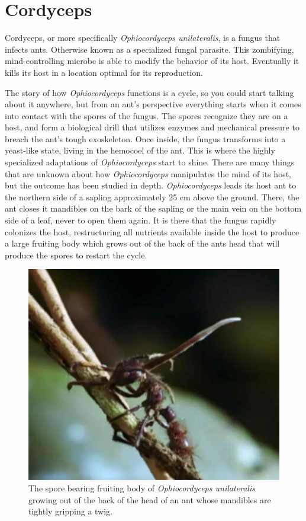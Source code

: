 \documentclass[twocolumn]{article}
\begin{document}
\section*{Cordyceps}
Cordyceps, or more specifically \textit{Ophiocordyceps unilateralis}, is a fungus that infects ants. Otherwise known as a specialized fungal parasite. This zombifying, mind-controlling microbe is able to modify the behavior of its host. Eventually it kills its host in a location optimal for its reproduction. 

The story of how \textit{Ophiocordyceps} functions is a cycle, so you could start talking about it anywhere, but from an ant's perspective everything starts when it comes into contact with the spores of the fungus. The spores recognize they are on a host, and form a biological drill that utilizes enzymes and mechanical pressure to breach the ant's tough exoskeleton. Once inside, the fungus transforms into a yeast-like state, living in the hemocoel of the ant.\cite{cordy_infection} This is where the highly specialized adaptations of \textit{Ophiocordyceps} start to shine. There are many things that are unknown about how \textit{Ophiocordyceps} manipulates the mind of its host, but the outcome has been studied in depth. \textit{Ophiocordyceps} leads its host ant to the northern side of a sapling approximately 25 cm above the ground. There, the ant closes it mandibles on the bark of the sapling or the main vein on the bottom side of a leaf, never to open them again. It is there that the fungus rapidly colonizes the host, restructuring all nutrients available inside the host to produce a large fruiting body which grows out of the back of the ants head that will produce the spores to restart the cycle.\cite{life_of_dead_ant}

\begin{figure}[!ht]
    \centering
    \includegraphics[width=.4\textwidth]{images/cordyceps_ant.jpg}
    \caption{The spore bearing fruiting body of \textit{Ophiocordyceps unilateralis} growing out of the back of the head of an ant whose mandibles are tightly gripping a twig.\cite{cordy_video} }
    \label{fig:cordyceps_ant}
\end{figure}
\end{document}
